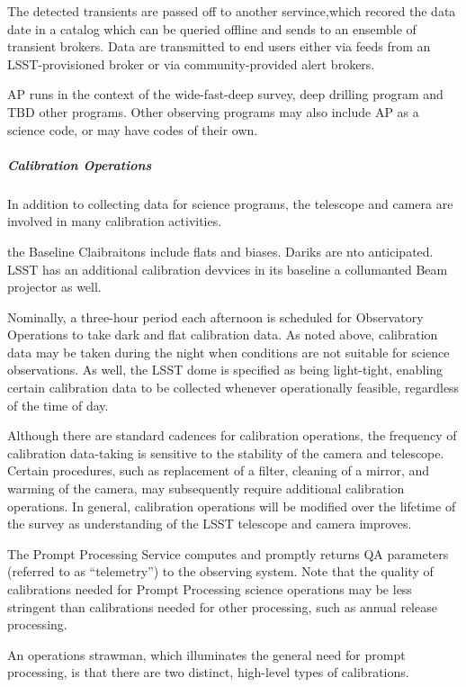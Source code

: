 The detected transients are passed off to another servince,which
recored the data date in a catalog which can be queried offline and sends
to an ensemble of transient brokers. Data are transmitted to end
users either via feeds from an LSST-provisioned broker or via
community-provided alert brokers.

AP runs in the context of the wide-fast-deep survey, deep drilling  program and TBD
other programs. Other observing programs may also include AP as a science code,
or may have codes of their own.

\subparagraph{Calibration Operations}

In addition to collecting data for science programs, the telescope and
camera are involved in many calibration activities.

the Baseline Claibraitons include flats and biases. Dariks are nto anticipated.
LSST has an additional calibration devvices in its baseline a collumanted
Beam projector as well.

Nominally, a three-hour period each afternoon is scheduled for Observatory
Operations to take dark and flat calibration data. As noted above, calibration data
may be taken during the night when conditions are not suitable for
science observations. As well, the LSST dome is specified as being
light-tight, enabling certain calibration data to be collected
whenever operationally feasible, regardless of the time of day.

Although there are standard cadences for calibration operations, the
frequency of calibration data-taking is sensitive to the stability of
the camera and telescope. Certain procedures, such as replacement of a
filter, cleaning of a mirror, and warming of the camera, may
subsequently require additional calibration operations. In general,
calibration operations will be modified over the lifetime of the
survey as understanding of the LSST telescope and camera improves.

The Prompt Processing Service computes and promptly returns QA
parameters (referred to as “telemetry”) to the observing system. Note
that the quality of calibrations needed for Prompt Processing science
operations may be less stringent than calibrations needed for other
processing, such as annual release processing.

An operations strawman, which illuminates the general need for prompt
processing, is that there are two distinct, high-level types of
calibrations.

